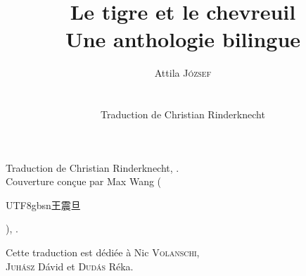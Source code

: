 \documentclass[11pt]{book}
\title{Le tigre et le chevreuil\\ {\large Une anthologie bilingue}}
\author{{\Large Attila \textsc{József}}\\\\\\
Traduction de Christian Rinderknecht}
\date{\oldstylenums{2026}}
\newcommand*{\centeredornament}{\centerline{\pgfornament[width=6cm]{88}}}
\newcommand{\zh}[1]{\begin{CJK}{UTF8}{gbsn}#1\end{CJK}}
\begin{document}


\thispagestyle{empty}

\mbox{}
\thispagestyle{empty}

\newpage\leavevmode\thispagestyle{empty}

\mbox{}
\thispagestyle{empty}

\maketitle

\thispagestyle{empty}

\vspace*{\fill}

\begin{flushright}
  \textcopyright{} Traduction de Christian Rinderknecht,
  .\\
  \textcopyright{} Couverture conçue par Max Wang (\zh{王震旦}), .
\end{flushright}

\newpage

\vspace*{4cm}

\begin{flushright}
  Cette traduction est dédiée à Nic \textsc{Volanschi}, \\
  \textsc{Juhász} Dávid et \textsc{Dudás} Réka.
\end{flushright}

\thispagestyle{empty}

\newpage\leavevmode\thispagestyle{empty}\newpage

\thispagestyle{empty}

\def\contentsname{\empty}
\tableofcontents

\thispagestyle{empty}
\newpage
\leavevmode\thispagestyle{empty}
\newpage
\clearpage


\vspace*{-15mm}
\centeredornament



\label{seul_toi_devrait_lire_mes_poemes}
\end{document}
